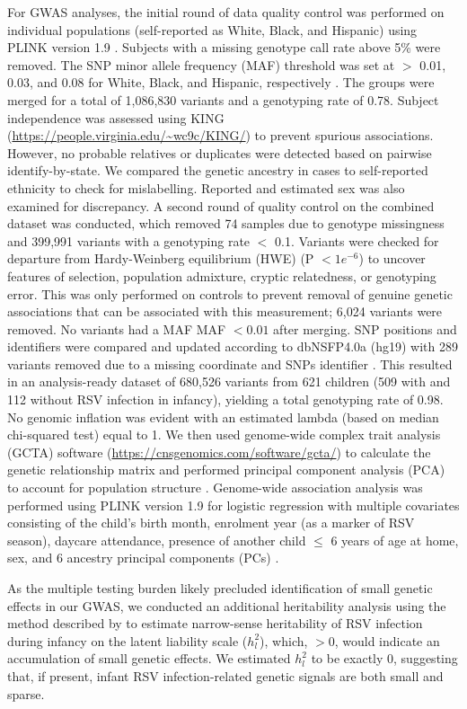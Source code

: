 \documentclass{article} %
\begin{document}
For GWAS analyses, the initial round of data quality control was performed on individual populations (self-reported as White, Black, and Hispanic) using PLINK version 1.9 \citep{purcell2007plink}. 
Subjects with a missing genotype call rate above 5\% were removed. 
The SNP minor allele frequency (MAF) threshold was set at $>$ 0.01, 0.03, and 0.08 for White, Black, and Hispanic, respectively \citep{yang2011gcta}. 
The groups were merged for a total of 1,086,830 variants and a genotyping rate of 0.78. Subject independence was assessed using KING (\url{https://people.virginia.edu/~wc9c/KING/}) to prevent spurious associations. 
However, no probable relatives or duplicates were detected based on pairwise identify-by-state. 
We compared the genetic ancestry in cases to self-reported ethnicity to check for mislabelling. Reported and estimated sex was also examined for discrepancy. 
A second round of quality control on the combined dataset was conducted, which removed 74 samples due to genotype missingness and 399,991 variants with a genotyping rate $<$ 0.1. 
Variants were checked for departure from Hardy-Weinberg equilibrium (HWE) (P $< 1e^{-6}$) to uncover features of selection, population admixture, cryptic relatedness, or genotyping error. 
This was only performed on controls to prevent removal of genuine genetic associations that can be associated with this measurement; 6,024 variants were removed. 
No variants had a MAF MAF $< 0.01$ after merging. SNP positions and identifiers were compared and updated according to dbNSFP4.0a (hg19) with 289 variants removed due to a missing coordinate and SNPs identifier \citep{liu2016dbnsfp}. 
This resulted in an analysis-ready dataset of 680,526 variants from 621 children (509 with and 112 without RSV infection in infancy), yielding a total genotyping rate of 0.98. 
No genomic inflation was evident with an estimated lambda (based on median chi-squared test) equal to 1. 
We then used genome-wide complex trait analysis (GCTA) software (\url{https://cnsgenomics.com/software/gcta/}) to calculate the genetic relationship matrix and performed principal component analysis (PCA) to account for population structure \citep{yang2011gcta}. 
Genome-wide association analysis was performed using PLINK version 1.9 for logistic regression with multiple covariates consisting of the child’s birth month, enrolment year (as a marker of RSV season), daycare attendance, presence of another child $\le$ 6 years of age at home, sex, and 6 ancestry principal components (PCs) \citep{purcell2007plink}.

As the multiple testing burden likely precluded identification of small genetic effects in our GWAS, we conducted an additional heritability analysis using the method described by \citet{golan2014measuring} to estimate narrow-sense heritability of RSV infection during infancy on the latent liability scale ($h_l^2$), which, $> 0$, would indicate an accumulation of small genetic effects. 
We estimated $h_l^2$  to be exactly 0, suggesting that, if present, infant RSV infection-related genetic signals are both small and sparse.
\end{document}
